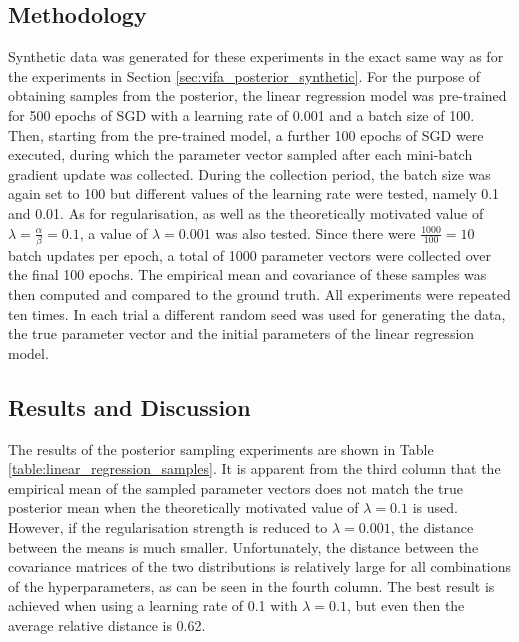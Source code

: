 \documentclass[msc,deptreport.inf]{infthesis} %
\begin{document}
\subsection{Methodology}

Synthetic data was generated for these experiments in the exact same way as for the experiments in Section \ref{sec:vifa_posterior_synthetic}. For the purpose of obtaining samples from the posterior, the linear regression model was pre-trained for 500 epochs of SGD with a learning rate of 0.001 and a batch size of 100. Then, starting from the pre-trained model, a further 100 epochs of SGD were executed, during which the parameter vector sampled after each mini-batch gradient update was collected. During the collection period, the batch size was again set to 100 but different values of the learning rate were tested, namely 0.1 and 0.01. As for regularisation, as well as the theoretically motivated value of $\lambda = \frac{\alpha}{\beta} = 0.1$, a value of $\lambda = 0.001$ was also tested. Since there were $\frac{1000}{100} = 10$ batch updates per epoch, a total of 1000 parameter vectors were collected over the final 100 epochs. The empirical mean and covariance of these samples was then computed and compared to the ground truth. All experiments were repeated ten times. In each trial a different random seed was used for generating the data, the true parameter vector and the initial parameters of the linear regression model. 

\subsection{Results and Discussion}

The results of the posterior sampling experiments are shown in Table \ref{table:linear_regression_samples}. It is apparent from the third column that the empirical mean of the sampled parameter vectors does not match the true posterior mean when the theoretically motivated value of $\lambda = 0.1$ is used. However, if the regularisation strength is reduced to $\lambda = 0.001$, the distance between the means is much smaller. Unfortunately, the distance between the covariance matrices of the two distributions is relatively large for all combinations of the hyperparameters, as can be seen in the fourth column. The best result is achieved when using a learning rate of 0.1 with $\lambda = 0.1$, but even then the average relative distance is 0.62. 
\end{document}
